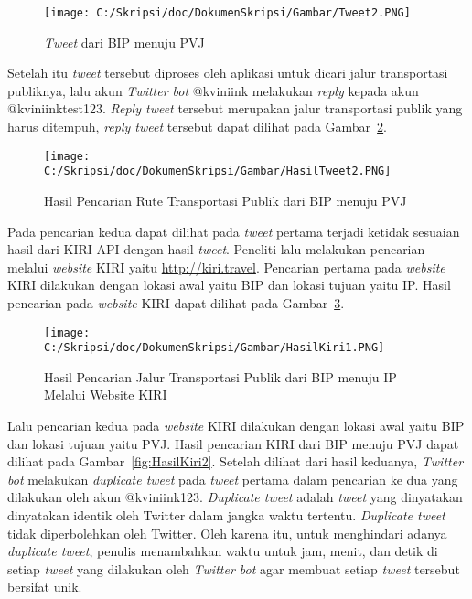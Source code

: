 \begin{enumerate}
	\begin{figure}
		\centering
			\texttt{[image: C:/Skripsi/doc/DokumenSkripsi/Gambar/Tweet2.PNG]}
		\caption{\textit{Tweet} dari BIP menuju PVJ}
		\label{fig:Tweet2}
	\end{figure}
	
	Setelah itu \textit{tweet} tersebut diproses oleh aplikasi untuk dicari jalur transportasi publiknya, lalu akun \textit{Twitter bot} @kviniink melakukan \textit{reply} kepada akun @kviniinktest123. \textit{Reply tweet} tersebut merupakan jalur transportasi publik yang harus ditempuh, \textit{reply tweet} tersebut dapat dilihat pada Gambar~\ref{fig:HasilTweet2}.
	
	
	\begin{figure}
		\centering
			\texttt{[image: C:/Skripsi/doc/DokumenSkripsi/Gambar/HasilTweet2.PNG]}
		\caption{Hasil Pencarian Rute Transportasi Publik dari BIP menuju PVJ}
		\label{fig:HasilTweet2}
	\end{figure}
	
	Pada pencarian kedua dapat dilihat pada \textit{tweet} pertama terjadi ketidak sesuaian hasil dari KIRI API dengan hasil \textit{tweet}.
	Peneliti lalu melakukan pencarian melalui \textit{website} KIRI yaitu \url{http://kiri.travel}. Pencarian pertama pada \textit{website} KIRI dilakukan dengan lokasi awal yaitu BIP dan lokasi tujuan yaitu IP. Hasil pencarian pada \textit{website} KIRI dapat dilihat pada Gambar~\ref{fig:HasilKiri1}.
	
	
	\begin{figure}
		\centering
			\texttt{[image: C:/Skripsi/doc/DokumenSkripsi/Gambar/HasilKiri1.PNG]}
		\caption{Hasil Pencarian Jalur Transportasi Publik dari BIP menuju IP Melalui Website KIRI}
		\label{fig:HasilKiri1}
	\end{figure}
	
	Lalu pencarian kedua pada \textit{website} KIRI dilakukan dengan lokasi awal yaitu BIP dan lokasi tujuan yaitu PVJ. Hasil pencarian KIRI dari BIP menuju PVJ dapat dilihat pada Gambar~\ref{fig:HasilKiri2}. Setelah dilihat dari hasil keduanya, \textit{Twitter bot} melakukan \textit{duplicate tweet} pada \textit{tweet} pertama dalam pencarian ke dua yang dilakukan oleh akun @kviniink123. \textit{Duplicate tweet} adalah \textit{tweet} yang dinyatakan dinyatakan identik oleh Twitter dalam jangka waktu tertentu. \textit{Duplicate tweet} tidak diperbolehkan oleh Twitter. Oleh karena itu, untuk menghindari adanya \textit{duplicate tweet}, penulis menambahkan waktu untuk jam, menit, dan detik di setiap \textit{tweet} yang dilakukan oleh \textit{Twitter bot} agar membuat setiap \textit{tweet} tersebut bersifat unik.
	

\end{enumerate}
